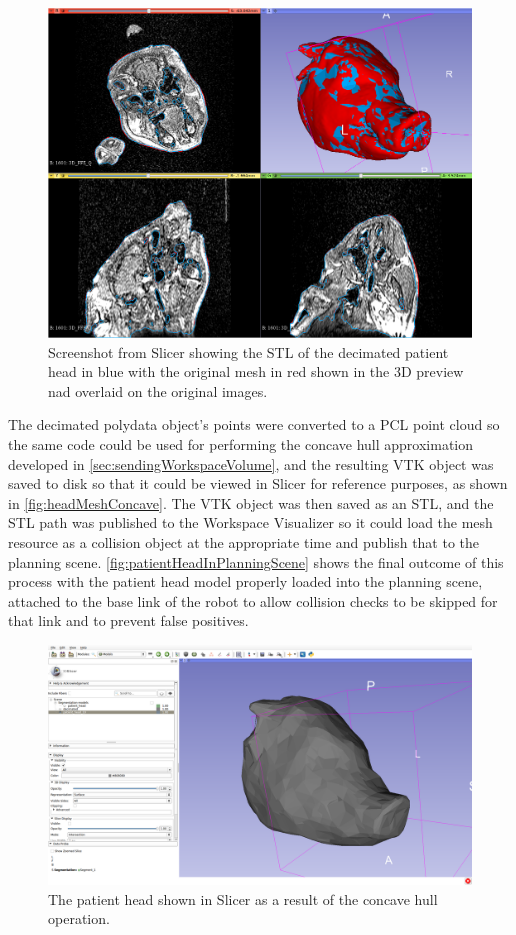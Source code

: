 \documentclass[12pt]{report}
\begin{document}
\begin{figure}[thpb]
	\centering
	\includegraphics[width=\textwidth]{images/mesh_resolution_compare.png}
    \caption{Screenshot from Slicer showing the STL of the decimated patient head in blue with the original mesh in red shown in the 3D preview nad overlaid on the original images.}
    \label{fig:meshCompare}
\end{figure}

The decimated polydata object's points were converted to a PCL point cloud so the same code could be used for performing the concave hull approximation developed in \autoref{sec:sendingWorkspaceVolume}, and the resulting VTK object was saved to disk so that it could be viewed in Slicer for reference purposes, as shown in \autoref{fig:headMeshConcave}. The VTK object was then saved as an STL, and the STL path was published to the Workspace Visualizer so it could load the mesh resource as a collision object at the appropriate time and publish that to the planning scene. \autoref{fig:patientHeadInPlanningScene} shows the final outcome of this process with the patient head model properly loaded into the planning scene, attached to the base link of the robot to allow collision checks to be skipped for that link and to prevent false positives.

\begin{figure}[thpb]
	\centering
	\includegraphics[width=\textwidth]{images/segmentation_convex_hull.png}
    \caption{The patient head shown in Slicer as a result of the concave hull operation.}
    \label{fig:headMeshConcave}
\end{figure}
\end{document}
